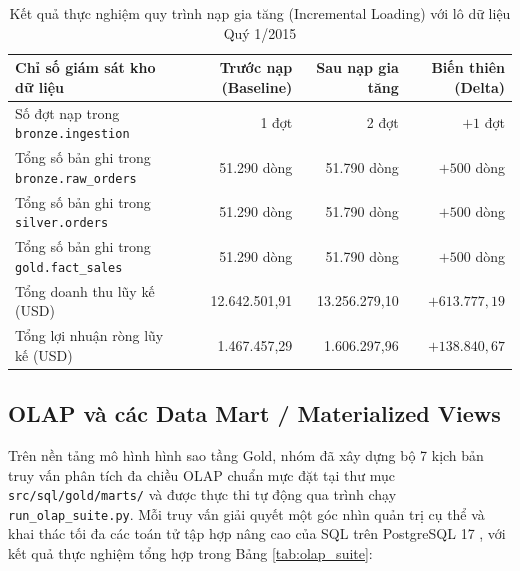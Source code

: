 \begin{table}[H]
\centering
\caption{Kết quả thực nghiệm quy trình nạp gia tăng (Incremental Loading) với lô dữ liệu Quý 1/2015}
\label{tab:incremental_results}
\small
\renewcommand{\arraystretch}{1.25}
\begin{tabularx}{\textwidth}{|X|r|r|r|}
\hline
\textbf{Chỉ số giám sát kho dữ liệu} & \textbf{Trước nạp (Baseline)} & \textbf{Sau nạp gia tăng} & \textbf{Biến thiên (Delta)} \\
\hline
Số đợt nạp trong \texttt{bronze.ingestion} & 1 đợt & 2 đợt & $+1$ đợt \\
\hline
Tổng số bản ghi trong \texttt{bronze.raw\_orders} & 51.290 dòng & 51.790 dòng & $+500$ dòng \\
\hline
Tổng số bản ghi trong \texttt{silver.orders} & 51.290 dòng & 51.790 dòng & $+500$ dòng \\
\hline
Tổng số bản ghi trong \texttt{gold.fact\_sales} & 51.290 dòng & 51.790 dòng & $+500$ dòng \\
\hline
Tổng doanh thu lũy kế (USD) & 12.642.501,91 & 13.256.279,10 & $+613.777,19$ \\
\hline
Tổng lợi nhuận ròng lũy kế (USD) & 1.467.457,29 & 1.606.297,96 & $+138.840,67$ \\
\hline
\end{tabularx}
\end{table}

\subsection{OLAP và các Data Mart / Materialized Views}

Trên nền tảng mô hình hình sao tầng Gold, nhóm đã xây dựng bộ 7 kịch bản truy vấn phân tích đa chiều OLAP chuẩn mực đặt tại thư mục \texttt{src/sql/gold/marts/} và được thực thi tự động qua trình chạy \texttt{run\_olap\_suite.py}. Mỗi truy vấn giải quyết một góc nhìn quản trị cụ thể và khai thác tối đa các toán tử tập hợp nâng cao của SQL trên PostgreSQL 17 \cite{postgresql17}, với kết quả thực nghiệm tổng hợp trong Bảng \ref{tab:olap_suite}:

